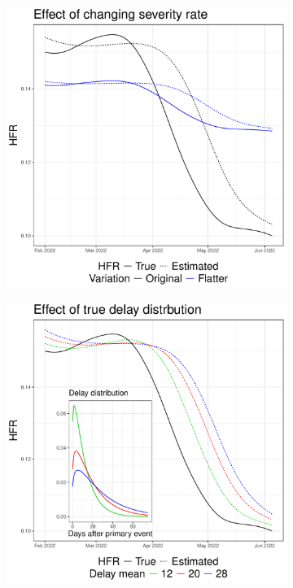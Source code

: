 \documentclass{article}
\begin{document}
\begin{figure}[hb]
\centering
\begin{subfigure}[b]{0.32\linewidth}
  \centering
  \includegraphics[width=\linewidth]{Figures/Simulated/toy_chging_hfr.pdf} 
  \caption{}
  \label{fig:toy_hfr}
\end{subfigure}
\begin{subfigure}[b]{0.32\linewidth}
  \centering
  \includegraphics[width=\linewidth]{Figures/Simulated/toy_delay_distr.pdf}

\end{subfigure}
\end{figure}
\end{document}
